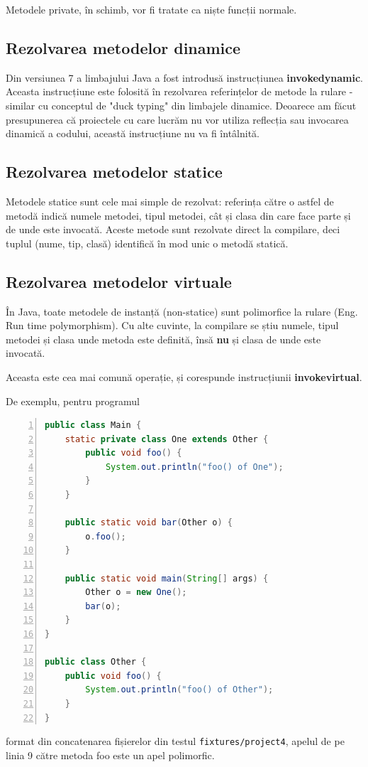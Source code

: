 Metodele private, în schimb, vor fi tratate ca niște funcții normale.

\subsection{Rezolvarea metodelor dinamice}

Din versiunea 7 a limbajului Java a fost introdusă instrucțiunea
\textbf{invokedynamic}.
Aceasta instrucțiune este folosită în rezolvarea referințelor de metode la
rulare - similar cu conceptul de "duck typing" din limbajele dinamice.
Deoarece am făcut presupunerea că proiectele cu care lucrăm nu vor utiliza
reflecția sau invocarea dinamică a codului, această instrucțiune nu va
fi întâlnită.

\subsection{Rezolvarea metodelor statice}

Metodele statice sunt cele mai simple de rezolvat: referința către o astfel de
metodă indică numele metodei, tipul metodei, cât și clasa din care face parte și
de unde este invocată.
Aceste metode sunt rezolvate direct la compilare, deci tuplul (nume, tip, clasă)
identifică în mod unic o metodă statică.

\subsection{Rezolvarea metodelor virtuale}

În Java, toate metodele de instanță (non-statice) sunt polimorfice la rulare
(Eng. Run time polymorphism).
Cu alte cuvinte, la compilare se știu numele, tipul metodei și clasa unde
metoda este definită, însă \textbf{nu} și clasa de unde este invocată.

Aceasta este cea mai comună operație, și corespunde instrucțiunii
\textbf{invokevirtual}.

De exemplu, pentru programul
\begin{lstlisting}[language=Java, numbers=left, label=program_metode_virtuale]
public class Main {
    static private class One extends Other {
        public void foo() {
            System.out.println("foo() of One");
        }
    }

    public static void bar(Other o) {
        o.foo();
    }

    public static void main(String[] args) {
        Other o = new One();
        bar(o);
    }
}

public class Other {
    public void foo() {
        System.out.println("foo() of Other");
    }
}
\end{lstlisting}
format din concatenarea fișierelor din testul \texttt{fixtures/project4},
apelul de pe linia 9 către metoda foo este un apel polimorfic.

